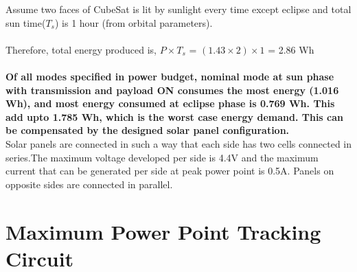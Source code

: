 Assume two faces of CubeSat is lit by sunlight every time except eclipse and total sun time($T_{s}$) is 1 hour (from orbital parameters).
\\ \\ Therefore, total energy produced is, $P \times  T_{s}$ = $(1.43 \times 2) \times 1$ = 2.86 Wh
\\ \\ \textbf{Of all modes specified in power budget, nominal mode at sun phase with transmission and payload ON consumes the most energy (1.016 Wh), and most energy consumed at eclipse phase is 0.769 Wh. This add upto 1.785 Wh, which is the worst case energy demand. This can be compensated by the designed solar panel configuration.}
\\
Solar panels are connected in such a way that each side has two cells connected in series.The maximum voltage developed per side is 4.4V and the maximum current that can be generated per side at peak power point is 0.5A.
Panels on opposite sides are connected in parallel.


\section[MPPT Circuit]{Maximum Power Point Tracking Circuit}

